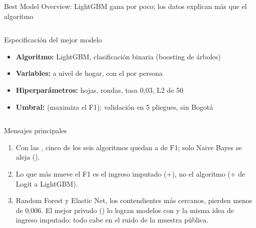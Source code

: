 \begin{frame}{Best Model Overview: LightGBM gana por poco; los datos explican más que el algoritmo}
  \begin{columns}[T]
    \begin{block}{Especificación del mejor modelo}
      \footnotesize
      \begin{itemize}\setlength{\itemsep}{1pt}
        \item \textbf{Algoritmo:} LightGBM, clasificación binaria (boosting de árboles)
        \item \textbf{Variables:} \nNVarsLGBM{} a nivel de hogar, con el  por persona
        \item \textbf{Hiperparámetros:} \nHojasLGBM{} hojas, \nRondasLGBM{} rondas, tasa 0,03, L2 de 50
        \item \textbf{Umbral:} \nThrLGBM{} (maximiza el F1); validación en 5 pliegues, sin Bogotá
      \end{itemize}
    \end{block}
    \vspace{2mm}
    \vspace{2mm}
  \end{columns}
  \begin{block}{Mensajes principales}
    \footnotesize
    \begin{enumerate}\setlength{\itemsep}{1pt}
      \item Con las , cinco de los seis algoritmos quedan a \SPRangeCinco{} de F1; solo Naive Bayes se aleja (\nSPNaiveBayes{}).
      \item Lo que más mueve el F1 es el ingreso imputado (+\nGainIncome{}), no el algoritmo (+\nGainAlgo{} de Logit a LightGBM).
      \item Random Forest y Elastic Net, los contendientes más cercanos, pierden menos de 0,006. El mejor privado (\KgPrivMax) lo logran modelos con  y la misma idea de ingreso imputado: todo cabe en el ruido de la muestra pública.
    \end{enumerate}
  \end{block}
\end{frame}

